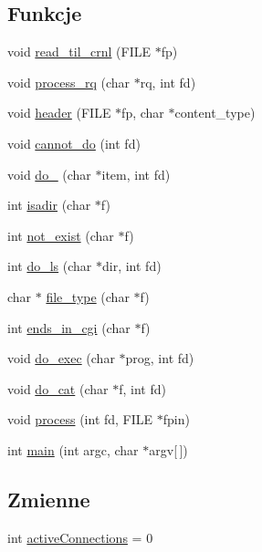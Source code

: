 \subsection*{Funkcje}
\begin{DoxyCompactItemize}
\item 
void \mbox{\hyperlink{10b-serwer_8c_aec3402ec3244a54e1bc086a1e1054755}{read\+\_\+til\+\_\+crnl}} (F\+I\+LE $\ast$fp)
\item 
void \mbox{\hyperlink{10b-serwer_8c_ad8ba6d5e4a00c2fff7a65af14096bd9b}{process\+\_\+rq}} (char $\ast$rq, int fd)
\item 
void \mbox{\hyperlink{10b-serwer_8c_adc7bfb1c892aecf61c0c73f3458caf90}{header}} (F\+I\+LE $\ast$fp, char $\ast$content\+\_\+type)
\item 
void \mbox{\hyperlink{10b-serwer_8c_a8e603d6f76a35b616135eb394f6ec080}{cannot\+\_\+do}} (int fd)
\item 
void \mbox{\hyperlink{10b-serwer_8c_ad3f91122750391e238cfbee3b88975ec}{do\+\_}} (char $\ast$item, int fd)
\item 
int \mbox{\hyperlink{10b-serwer_8c_a68ac50fc5196973b9f3ef7b4992f7279}{isadir}} (char $\ast$f)
\item 
int \mbox{\hyperlink{10b-serwer_8c_a963f754c08801de5f56c78f1b26e3a86}{not\+\_\+exist}} (char $\ast$f)
\item 
int \mbox{\hyperlink{10b-serwer_8c_a83999b0603c38aa5fe08f7ed801e6cfe}{do\+\_\+ls}} (char $\ast$dir, int fd)
\item 
char $\ast$ \mbox{\hyperlink{10b-serwer_8c_a29b9ee72561809560e62a9ea307d1ff6}{file\+\_\+type}} (char $\ast$f)
\item 
int \mbox{\hyperlink{10b-serwer_8c_ad3ef3c593d3a792b02a341450eaa62dd}{ends\+\_\+in\+\_\+cgi}} (char $\ast$f)
\item 
void \mbox{\hyperlink{10b-serwer_8c_a0a305ff573da158eaa9484e5506921c0}{do\+\_\+exec}} (char $\ast$prog, int fd)
\item 
void \mbox{\hyperlink{10b-serwer_8c_adab7e9f2617cceb5752ef3f97cfc2ef1}{do\+\_\+cat}} (char $\ast$f, int fd)
\item 
void \mbox{\hyperlink{10b-serwer_8c_a182f39efe710f6e9bf678baa9e8eafa3}{process}} (int fd, F\+I\+LE $\ast$fpin)
\item 
int \mbox{\hyperlink{10b-serwer_8c_a0ddf1224851353fc92bfbff6f499fa97}{main}} (int argc, char $\ast$argv\mbox{[}$\,$\mbox{]})
\end{DoxyCompactItemize}
\subsection*{Zmienne}
\begin{DoxyCompactItemize}
\item 
int \mbox{\hyperlink{10b-serwer_8c_a1f5bcbe2b6bbbf057f1e857d6466ac34}{active\+Connections}} = 0
\end{DoxyCompactItemize}


